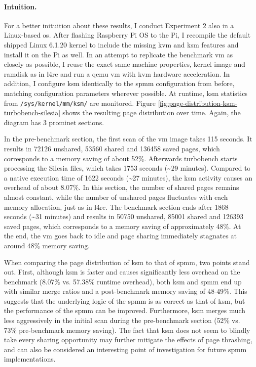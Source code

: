 \paragraph{Intuition.}

For a better inituition about these results, I conduct Experiment 2 also in a Linux-based \ac{os}.
After flashing Raspberry Pi OS to the Pi, I recompile the default shipped Linux 6.1.20 kernel to include the missing \ac{kvm} and \ac{ksm} features and install it on the Pi as well.
In an attempt to replicate the benchmark \ac{vm} as closely as possible, I reuse the exact same machine properties, kernel image and ramdisk as in \ac{l4re} and run a qemu \ac{vm} with \ac{kvm} hardware acceleration.
In addition, I configure \ac{ksm} identically to the \ac{spmm} configuration from before, matching configuration parameters wherever possible.
At runtime, \ac{ksm} statistics from \texttt{/sys/kernel/mm/ksm/} are monitored.
Figure \ref{fig:page-distribution-ksm-turbobench-silesia} shows the resulting page distribution over time.
Again, the diagram has 3 prominet sections.

In the pre-benchmark section, the first scan of the \ac{vm} image takes 115 seconds.
It results in 72126 unshared, 53560 shared and 136458 saved pages, which corresponds to a memory saving of about 52\%.
Afterwards turbobench starts processing the Silesia files, which takes 1753 seconds (\textasciitilde{}29 minutes).
Compared to a native execution time of 1622 seconds (\textasciitilde{}27 minutes), the \ac{ksm} activity causes an overhead of about 8.07\%.
In this section, the number of shared pages remains almost constant, while the number of unshared pages fluctuates with each memory allocation, just as in \ac{l4re}.
The benchmark section ends after 1868 seconds (\textasciitilde{}31 minutes) and results in 50750 unshared, 85001 shared and 126393 saved pages, which corresponds to a memory saving of approximately 48\%.
At the end, the \ac{vm} goes back to idle and page sharing immediately stagnates at around 48\% memory saving.

When comparing the page distribution of \ac{ksm} to that of \ac{spmm}, two points stand out.
First, although \ac{ksm} is faster and causes significantly less overhead on the benchmark (8.07\% vs. 57.38\% runtime overhead), both \ac{ksm} and \ac{spmm} end up with similar merge ratios and a post-benchmark memory saving of 48-49\%.
This suggests that the underlying logic of the \ac{spmm} is as correct as that of \ac{ksm}, but the performance of the \ac{spmm} can be improved.
Furthermore, \ac{ksm} merges much less aggressively in the initial scan during the pre-benchmark section (52\% vs. 73\% pre-benchmark memory saving).
The fact that \ac{ksm} does not seem to blindly take every sharing opportunity may further mitigate the effects of page thrashing, and can also be considered an interesting point of investigation for future \ac{spmm} implementations.

